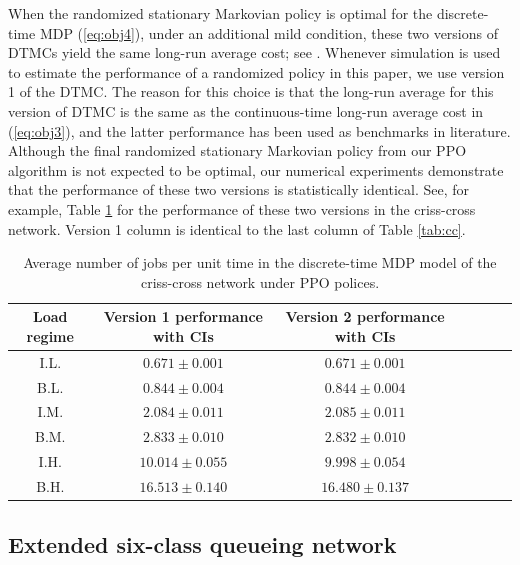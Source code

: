 \documentclass[11pt]{article}
\theoremstyle{definition}
\numberwithin{equation}{section}
\begin{document}
When the randomized stationary Markovian policy is optimal for the
discrete-time MDP (\ref{eq:obj4}), under an additional mild condition,
these two versions of DTMCs yield the same long-run average cost; see
\cite[Theorem 3.6]{Beutler1987}. Whenever simulation is used to estimate
the performance of a randomized policy in this paper, we use
version 1 of the DTMC. The reason for this choice is that the long-run
average for this version of DTMC is the same as the continuous-time
long-run average cost in (\ref{eq:obj3}), and the latter performance
has been used as  benchmarks in literature.
Although the final randomized stationary Markovian policy from our PPO
algorithm is not expected to be optimal, our numerical experiments
demonstrate that the performance of these two versions is statistically
identical.  See, for example, Table \ref{tab:cc2} for the performance of
these two versions in the criss-cross network.  Version 1 column is
identical to the last column of Table \ref{tab:cc}.
 \begin{table}[H]
\centering
\begin{tabular}{|c|c|c|c|c|c|c|}
  \hline
  Load regime   & Version 1 performance with CIs &   Version 2 performance with CIs
  \\\hline
  I.L. &$0.671\pm 0.001$&       $0.671\pm 0.001$ \\\hline
  B.L. &  $0.844\pm 0.004$&    $0.844\pm 0.004$\\\hline
  I.M. & $2.084\pm0.011$ &       $2.085\pm0.011$ \\\hline
  B.M. &  $2.833\pm 0.010$ &      $2.832\pm 0.010$\\\hline
  I.H. & $10.014\pm0.055$ &   $9.998\pm0.054$\\\hline
  B.H. &   $16.513\pm 0.140$ &       $16.480\pm 0.137$ \\

  \hline


\end{tabular}

 \caption[]{Average number of jobs per unit time in the discrete-time MDP model of the criss-cross network under PPO polices.}\label{tab:cc2}%
\end{table}





\subsection{Extended six-class queueing network}\label{sec:ext}
\end{document}
